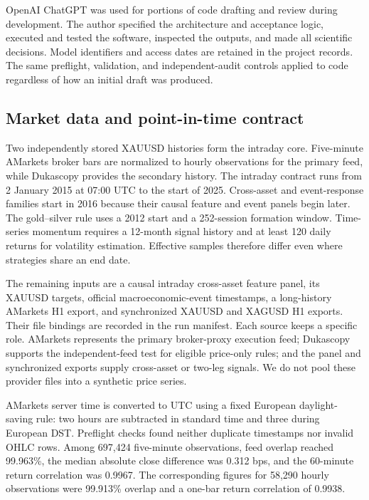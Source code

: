 OpenAI ChatGPT was used for portions of code drafting and review during development. The author specified the architecture and acceptance logic, executed and tested the software, inspected the outputs, and made all scientific decisions. Model identifiers and access dates are retained in the project records. The same preflight, validation, and independent-audit controls applied to code regardless of how an initial draft was produced.

\subsection{Market data and point-in-time contract}\label{subsec:data}

Two independently stored XAUUSD histories form the intraday core. Five-minute AMarkets broker bars are normalized to hourly observations for the primary feed, while Dukascopy provides the secondary history. The intraday contract runs from 2 January 2015 at 07:00 UTC to the start of 2025. Cross-asset and event-response families start in 2016 because their causal feature and event panels begin later. The gold--silver rule uses a 2012 start and a 252-session formation window. Time-series momentum requires a 12-month signal history and at least 120 daily returns for volatility estimation. Effective samples therefore differ even where strategies share an end date.

The remaining inputs are a causal intraday cross-asset feature panel, its XAUUSD targets, official macroeconomic-event timestamps, a long-history AMarkets H1 export, and synchronized XAUUSD and XAGUSD H1 exports. Their file bindings are recorded in the run manifest. Each source keeps a specific role. AMarkets represents the primary broker-proxy execution feed; Dukascopy supports the independent-feed test for eligible price-only rules; and the panel and synchronized exports supply cross-asset or two-leg signals. We do not pool these provider files into a synthetic price series.

AMarkets server time is converted to UTC using a fixed European daylight-saving rule: two hours are subtracted in standard time and three during European DST. Preflight checks found neither duplicate timestamps nor invalid OHLC rows. Among 697,424 five-minute observations, feed overlap reached 99.963\%, the median absolute close difference was 0.312 bps, and the 60-minute return correlation was 0.9967. The corresponding figures for 58,290 hourly observations were 99.913\% overlap and a one-bar return correlation of 0.9938.

